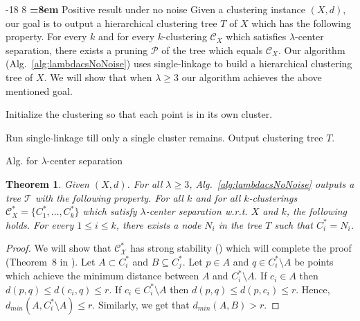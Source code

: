 \documentclass[12pt]{article}
\makeatletter
\newtheorem{theorem}{Theorem}
\newcommand{\mc}{\mathcal}
\renewcommand\subsubsection{\@startsection{subsubsection}{3}{\z@}%
   {-18\p@ \@plus -4\p@ \@minus -4\p@}%
   {8\p@ \@plus 4\p@ \@minus 4\p@}%
   {\normalfont\normalsize\bfseries\boldmath
   \rightskip=\z@ \@plus 8em \pretolerance=10000}}
\makeatother
\begin{document}

\subsubsection{Positive result under no noise}
\label{section:positiveNoNoiseLambda}
Given a clustering instance $(X, d)$, our goal is to output a hierarchical clustering tree $T$ of $X$ which has the following property. For every $k$ and for every $k$-clustering $\mc C_{X}$ which satisfies $\lambda$-center separation, there exists a pruning $\mc P$ of the tree which equals $\mc C_{X}$. Our algorithm (Alg.~\ref{alg:lambdacsNoNoise}) uses single-linkage to build a hierarchical clustering tree of $X$. We will show that when $\lambda \ge 3$ our algorithm achieves the above mentioned goal. 

\begin{algorithm}[!t]
	\SetAlgoLined
	\Indp{}
	
	\vspace{2mm} Initialize the clustering so that each point is in its own cluster.
	
	Run single-linkage till only a single cluster remains. Output clustering tree $T$.

\caption{Alg. for $\lambda$-center separation}
\label{alg:lambdacsNoNoise}
\end{algorithm}
\vspace{-.1in}
\begin{theorem}
\label{thm:lambdaNoNoisePositive}
Given $(X , d)$. For all $\lambda \ge 3$, Alg.~\ref{alg:lambdacsNoNoise} outputs a tree $\mc T$ with the following property. For all $k$ and for all $k$-clusterings $\mc C_{X}^* = \{C_1^*, \ldots, C_k^* \}$ which satisfy $\lambda$-center separation w.r.t. $X$ and $k$, the following holds. For every $1 \le i \le k$, there exists a node $N_i$ in the tree $T$ such that $C_i^* = N_i$.
\end{theorem}
\begin{proof}
We will show that $\mc C_{\mc X}^*$ has strong stability (\cite{balcan2008discriminative}) which will complete the proof (Theorem~8 in \cite{balcan2008discriminative}). Let $A \subset C_i^*$ and $B \subseteq C_j^*$. Let $p \in A$ and $q \in C_i^* \setminus A$ be points which achieve the minimum distance between $A$ and $C_i^*\setminus A$. If $c_i \in A$ then $d(p, q) \le d(c_i, q) \le r$. If $c_i \in C_i^* \setminus A$ then $d(p, q) \le d(p, c_i) \le r$. Hence, $d_{min} (A, C_i^*\setminus A) \le r$. Similarly, we get that $d_{min}(A, B) > r$.
\end{proof}
\end{document}
